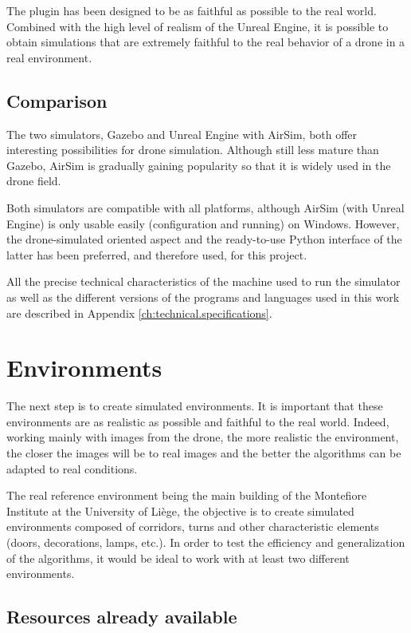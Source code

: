 The plugin has been designed to be as faithful as possible to the real world. Combined with the high level of realism of the Unreal Engine, it is possible to obtain simulations that are extremely faithful to the real behavior of a drone in a real environment.

\subsection{Comparison}

The two simulators, Gazebo and Unreal Engine with AirSim, both offer interesting possibilities for drone simulation. Although still less mature than Gazebo, AirSim is gradually gaining popularity so that it is widely used in the drone field.

Both simulators are compatible with all platforms, although AirSim (with Unreal Engine) is only usable easily (configuration and running) on Windows. However, the drone-simulated oriented aspect and the ready-to-use Python interface of the latter has been preferred, and therefore used, for this project.

\begin{note}
    All the precise technical characteristics of the machine used to run the simulator as well as the different versions of the programs and languages used in this work are described in Appendix \ref{ch:technical.specifications}.
\end{note}

\section{Environments}

The next step is to create simulated environments. It is important that these environments are as realistic as possible and faithful to the real world. Indeed, working mainly with images from the drone, the more realistic the environment, the closer the images will be to real images and the better the algorithms can be adapted to real conditions.

The real reference environment being the main building of the Montefiore Institute at the University of Liège, the objective is to create simulated environments composed of corridors, turns and other characteristic elements (doors, decorations, lamps, etc.). In order to test the efficiency and generalization of the algorithms, it would be ideal to work with at least two different environments.

\subsection{Resources already available}


